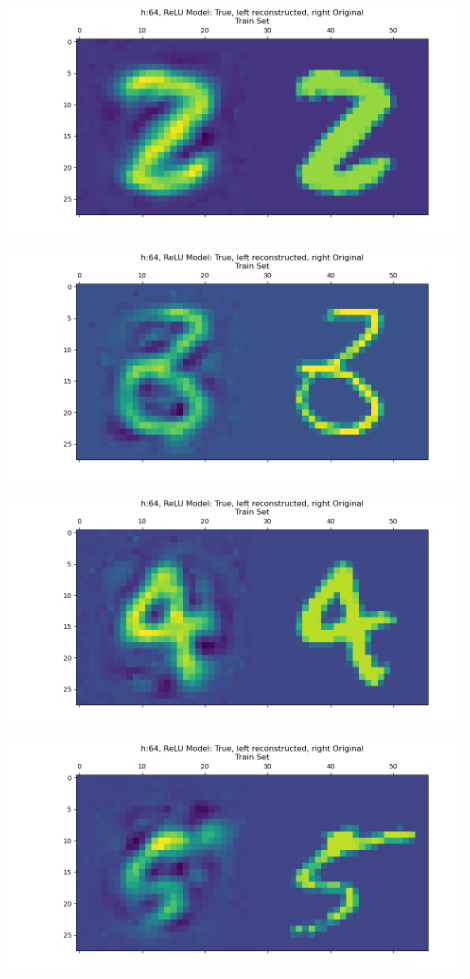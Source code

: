 \documentclass[]{article}
\begin{document}
        \begin{center}
            \includegraphics*[width=12cm]{A4plots/06-53-51-h-64-nonlin-digit-2.png}
        \end{center}
        \begin{center}
            \includegraphics*[width=12cm]{A4plots/06-53-52-h-64-nonlin-digit-3.png}
        \end{center}
        \begin{center}
            \includegraphics*[width=12cm]{A4plots/06-53-52-h-64-nonlin-digit-4.png}
        \end{center}
        \begin{center}
            \includegraphics*[width=12cm]{A4plots/06-53-52-h-64-nonlin-digit-5.png}
        \end{center}
\end{document}
